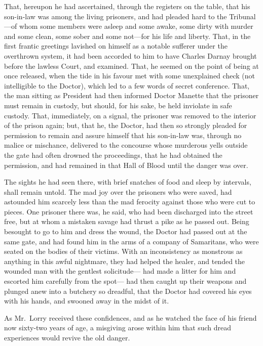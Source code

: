 That, hereupon he had ascertained, through the registers on the table,
that his son-in-law was among the living prisoners, and had pleaded
hard to the Tribunal---of whom some members were asleep and some awake,
some dirty with murder and some clean, some sober and some not---for
his life and liberty.  That, in the first frantic greetings lavished
on himself as a notable sufferer under the overthrown system, it had
been accorded to him to have Charles Darnay brought before the lawless
Court, and examined.  That, he seemed on the point of being at once
released, when the tide in his favour met with some unexplained check
(not intelligible to the Doctor), which led to a few words of secret
conference.  That, the man sitting as President had then informed
Doctor Manette that the prisoner must remain in custody, but should,
for his sake, be held inviolate in safe custody.  That, immediately,
on a signal, the prisoner was removed to the interior of the prison
again; but, that he, the Doctor, had then so strongly pleaded for
permission to remain and assure himself that his son-in-law was,
through no malice or mischance, delivered to the concourse whose
murderous yells outside the gate had often drowned the proceedings,
that he had obtained the permission, and had remained in that Hall of
Blood until the danger was over.

The sights he had seen there, with brief snatches of food and sleep
by intervals, shall remain untold.  The mad joy over the prisoners
who were saved, had astounded him scarcely less than the mad ferocity
against those who were cut to pieces.  One prisoner there was, he
said, who had been discharged into the street free, but at whom a
mistaken savage had thrust a pike as he passed out.  Being besought
to go to him and dress the wound, the Doctor had passed out at the
same gate, and had found him in the arms of a company of Samaritans,
who were seated on the bodies of their victims.  With an inconsistency
as monstrous as anything in this awful nightmare, they had helped the
healer, and tended the wounded man with the gentlest solicitude---%
had made a litter for him and escorted him carefully from the spot---%
had then caught up their weapons and plunged anew into a butchery so
dreadful, that the Doctor had covered his eyes with his hands, and
swooned away in the midst of it.

As Mr.\ Lorry received these confidences, and as he watched the face
of his friend now sixty-two years of age, a misgiving arose within
him that such dread experiences would revive the old danger.

